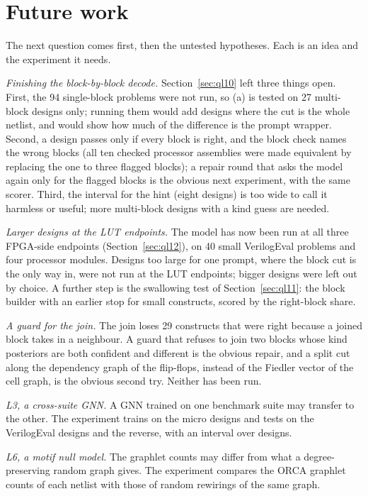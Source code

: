 \documentclass[conference]{IEEEtran}
\begin{document}
\section{Future work}
\label{sec:future}

The next question comes first, then the untested hypotheses. Each is an idea and the experiment it needs.

\emph{Finishing the block-by-block decode.} Section~\ref{sec:ql10} left three things open. First, the 94 single-block problems
were not run, so (a) is tested on 27 multi-block designs only; running them would add designs where the cut is the whole netlist,
and would show how much of the difference is the prompt wrapper. Second, a design passes only if every block is right, and the block
check names the wrong blocks (all ten checked processor assemblies were made equivalent by replacing the one to three flagged blocks);
a repair round that asks the model again only for the flagged blocks is the obvious next experiment, with the same scorer. Third, the
interval for the hint (eight designs) is too wide to call it harmless or useful; more multi-block designs with a kind guess are needed.

\emph{Larger designs at the LUT endpoints.} The model has now been run at all three FPGA-side endpoints (Section~\ref{sec:ql12}), on 40 small VerilogEval problems and four processor modules. Designs too large for one prompt, where the block cut is the only way in, were not run at the LUT endpoints; bigger designs were left out by choice. A further step is the swallowing test of Section~\ref{sec:ql11}: the block builder with an earlier stop for small constructs, scored by the right-block share.

\emph{A guard for the join.} The join loses 29 constructs that were right because a joined block takes in
a neighbour. A guard that refuses to join two blocks whose kind posteriors are both confident and
different is the obvious repair, and a split cut along the dependency graph of the flip-flops, instead
of the Fiedler vector of the cell graph, is the obvious second try. Neither has been run.

\emph{L3, a cross-suite GNN.} A GNN trained on one benchmark suite may transfer to the other. The experiment
trains on the micro designs and tests on the VerilogEval designs and the reverse, with an interval over designs.

\emph{L6, a motif null model.} The graphlet counts may differ from what a degree-preserving random graph
gives. The experiment compares the ORCA graphlet counts of each netlist with those of random rewirings of the
same graph.
\end{document}
